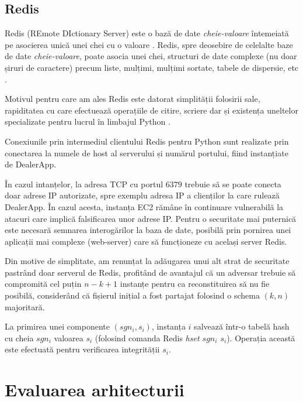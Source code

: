 \documentclass[oneside, 12pt]{book}
\begin{document}
\subsection{Redis}
\label{subsec:redis}

Redis (REmote DIctionary Server) este o bază de date \textit{cheie-valoare} întemeiată pe asocierea unică unei chei cu o valoare \cite{cattell:2011scalable}. Redis, spre deosebire de celelalte baze de date \textit{cheie-valoare}, poate asocia unei chei, structuri de date complexe (nu doar șiruri de caractere) precum liste, mulțimi, mulțimi sortate, tabele de dispersie, etc \cite{website:redis-documentation}.

Motivul pentru care am ales Redis este datorat simplității folosirii sale, rapiditatea cu care efectuează operațiile de citire, scriere dar și existența uneltelor specializate pentru lucrul în limbajul Python \cite{website:redis-documentation, website:redis-py}.

Conexiunile prin intermediul clientului Redis pentru Python sunt realizate prin conectarea la numele de host al serverului și numărul portului, fiind instanțiate de DealerApp.

În cazul intanțelor, la adresa TCP cu portul $6379$ trebuie să se poate conecta doar adrese IP autorizate, spre exemplu adresa IP a clienților la care rulează DealerApp. În cazul acesta, instanța EC2 rămâne în continuare vulnerabilă la atacuri care implică falsificarea unor adrese IP. Pentru o securitate mai puternică este necesară semnarea interogărilor la baza de date, posibilă prin pornirea unei aplicații mai complexe (web-server) care să funcționeze cu același server Redis.

Din motive de simplitate, am renunțat la adăugarea unui alt strat de securitate pastrând doar serverul de Redis, profitând de avantajul că un adversar trebuie să compromită cel puțin $n-k+1$ instanțe pentru ca reconstituirea să nu fie posibilă, considerând că fișierul inițial a fost partajat folosind o schema $(k, n)$ majoritară.

La primirea unei componente $(sgn_i, s_i)$, instanța $i$ salvează într-o tabelă hash cu cheia $sgn_i$ valoarea $s_i$ (folosind comanda Redis \textit{hset $sgn_i$ $s_i$}). Operația această este efectuată pentru verificarea integrității $s_i$.


\section{Evaluarea arhitecturii}
\end{document}

